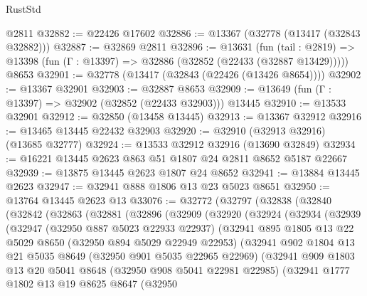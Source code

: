\begin{lexlean}{RustStd}
\begin{coremodule}
    @2811
@32882 := @22426 @17602
@32886 := @13367 (@32778 (@13417 (@32843 @32882)))
@32887 := @32869 @2811
@32896 := @13631
    (fun (tail : @2819) => @13398 (fun (Γ : @13397) => @32886 (@32852 (@22433 (@32887 @13429)))))
    @8653
@32901 := @32778 (@13417 (@32843 (@22426 (@13426 @8654))))
@32902 := @13367 @32901
@32903 := @32887 @8653
@32909 := @13649 (fun (Γ : @13397) => @32902 (@32852 (@22433 @32903))) @13445
@32910 := @13533 @32901
@32912 := @32850 (@13458 @13445)
@32913 := @13367 @32912
@32916 := @13465 @13445 @22432 @32903
@32920 := @32910 (@32913 @32916) (@13685 @32777)
@32924 := @13533 @32912 @32916 (@13690 @32849)
@32934 := @16221 @13445 @2623 @863 @51 @1807 @24 @2811 @8652 @5187 @22667
@32939 := @13875 @13445 @2623 @1807 @24 @8652
@32941 := @13884 @13445 @2623
@32947 := @32941 @888 @1806 @13 @23 @5023 @8651
@32950 := @13764 @13445 @2623 @13
@33076 := @32772
    (@32797
      (@32838
        (@32840
          (@32842
            (@32863
              (@32881
                (@32896
                  (@32909
                    (@32920
                      (@32924
                        (@32934
                          (@32939
                            (@32947
                              (@32950 @887 @5023 @22933 @22937)
                              (@32941
                                @895
                                @1805
                                @13
                                @22
                                @5029
                                @8650
                                (@32950 @894 @5029 @22949 @22953)
                                (@32941
                                  @902
                                  @1804
                                  @13
                                  @21
                                  @5035
                                  @8649
                                  (@32950 @901 @5035 @22965 @22969)
                                  (@32941
                                    @909
                                    @1803
                                    @13
                                    @20
                                    @5041
                                    @8648
                                    (@32950 @908 @5041 @22981 @22985)
                                    (@32941
                                      @1777
                                      @1802
                                      @13
                                      @19
                                      @8625
                                      @8647
                                      (@32950

\end{coremodule}
\end{lexlean}
